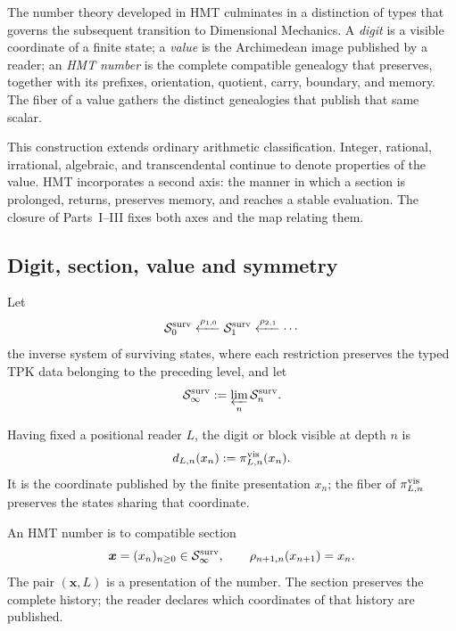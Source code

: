 The number theory developed in HMT culminates in a distinction of types that governs the subsequent transition to Dimensional Mechanics. A \emph{digit} is a visible coordinate of a finite state; a \emph{value} is the Archimedean image published by a reader; an \emph{HMT number} is the complete compatible genealogy that preserves, together with its prefixes, orientation, quotient, carry, boundary, and memory. The fiber of a value gathers the distinct genealogies that publish that same scalar.

This construction extends ordinary arithmetic classification. Integer,
rational, irrational, algebraic, and transcendental continue to denote
properties of the value. HMT incorporates a second axis: the manner in which a
section is prolonged, returns, preserves memory, and reaches a stable
evaluation. The closure of Parts~I--III fixes both axes and the map relating them.

\subsection{Digit, section, value and symmetry}

Let
\[
 \mathcal S_0^{\rm surv}
 \xleftarrow{\rho_{1,0}}
 \mathcal S_1^{\rm surv}
 \xleftarrow{\rho_{2,1}}
 \cdots
\]
the inverse system of surviving states, where each restriction
preserves the typed TPK data belonging to the preceding level, and let
\[
 \mathcal S_\infty^{\rm surv}
 :=\varprojlim_n\mathcal S_n^{\rm surv}.
\]

\begin{definition}[Ciphers]
\label{p3-83-c44-s2:def:cifra-visible-genealogica}
Having fixed a positional reader \(L\), the digit or block visible
at depth \(n\) is
\[
 d_{L,n}(x_n):=\pi^{\rm vis}_{L,n}(x_n).
\]
It is the coordinate published by the finite presentation
\(x_n\); the fiber of \(\pi^{\rm vis}_{L,n}\) preserves the states sharing that
coordinate.
\end{definition}

\begin{definition}
\label{p3-83-c44-s2:def:numero-hmt-cierre-genealogico}
An HMT number is to compatible section
\[
 \boldsymbol x=(x_n)_{n\geq0}\in\mathcal S_\infty^{\rm surv},
 \qquad
 \rho_{n+1,n}(x_{n+1})=x_n.
\]
The pair \((\boldsymbol x,L)\) is a presentation of the number. The section
preserves the complete history; the reader declares which coordinates of that
history are published.
\end{definition}


